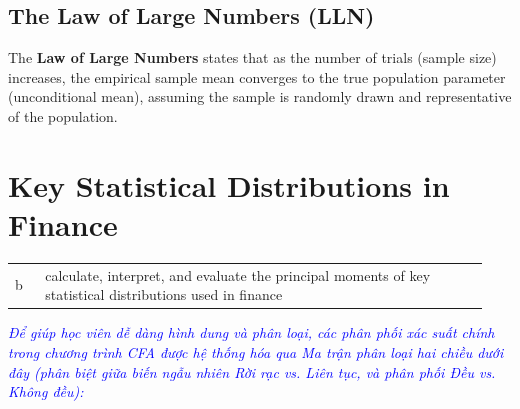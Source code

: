 \subsection{The Law of Large Numbers (LLN)}
	\label{subsec:The Law of Large Numbers (LLN)}
The \textbf{Law of Large Numbers} states that as the number of trials (sample size) increases, the empirical sample mean converges to the true population parameter (unconditional mean), assuming the sample is randomly drawn and representative of the population.


\section{Key Statistical Distributions in Finance}
\label{sec:Key Statistical Distributions in Finance}
\begin{center}
\begin{tabular}{p{0.06\linewidth} | p{0.88\linewidth}}
	b & calculate, interpret, and evaluate the principal moments of key statistical distributions used in finance \\
\end{tabular}
\end{center}

\textcolor{blue}{\textit{Để giúp học viên dễ dàng hình dung và phân loại, các phân phối xác suất chính trong chương trình CFA được hệ thống hóa qua Ma trận phân loại hai chiều dưới đây (phân biệt giữa biến ngẫu nhiên Rời rạc vs. Liên tục, và phân phối Đều vs. Không đều):}}

